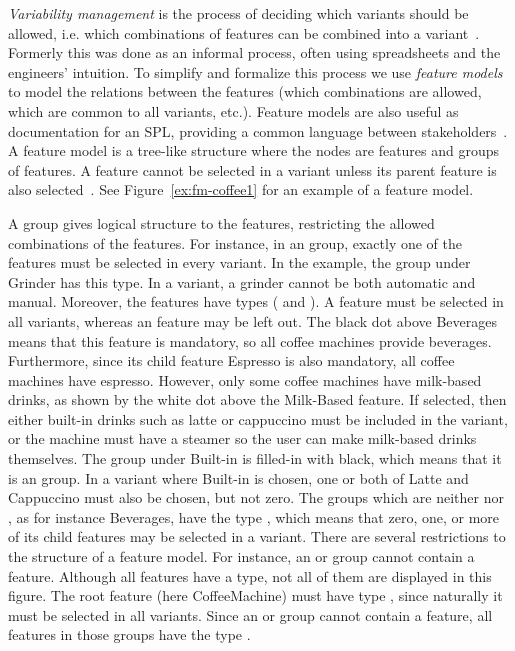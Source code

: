 \emph{Variability management} is the process of deciding which variants should be allowed, i.e. which combinations of features can be combined into a variant~\cite{art:variability-management-with-feature-models}. Formerly this was done as an informal process, often using spreadsheets and the engineers' intuition. To simplify and formalize this process we use \emph{feature models} to model the relations between the features (which combinations are allowed, which are common to all variants, etc.). Feature models are also useful as documentation for an SPL, providing a common language between stakeholders~\cite{book:introduction-to-spl}. A feature model is a tree-like structure where the nodes are features and groups of features. A feature cannot be selected in a variant unless its parent feature is also selected~\cite{art:feature-models-grammars-and-propositional-formulas}. See Figure~\vref{ex:fm-coffee1} for an example of a feature model. 

A group gives logical structure to the features, restricting the allowed combinations of the features. For instance, in an \xortype{} group, exactly one of the features must be selected in every variant. In the example, the group under Grinder has this type. In a variant, a grinder cannot be both automatic and manual. Moreover, the features have types (\optional{} and \mandatory{}). A \mandatory{} feature must be selected in all variants, whereas an \optional{} feature may be left out. The black dot above Beverages means that this feature is mandatory, so all coffee machines provide beverages. Furthermore, since its child feature Espresso is also mandatory, all coffee machines have espresso. However, only some coffee machines have milk-based drinks, as shown by the white dot above the Milk-Based feature. If selected, then either built-in drinks such as latte or cappuccino must be included in the variant, or the machine must have a steamer so the user can make milk-based drinks themselves. The group under Built-in is filled-in with black, which means that it is an \ortype{} group. In a variant where Built-in is chosen, one or both of Latte and Cappuccino must also be chosen, but not zero. The groups which are neither \xortype{} nor \ortype{}, as for instance Beverages, have the type \andtype{}, which means that zero, one, or more of its child features may be selected in a variant. There are several restrictions to the structure of a feature model. For instance, an \xortype{} or \ortype{} group cannot contain a \mandatory{} feature. Although all features have a type, not all of them are displayed in this figure. The root feature (here CoffeeMachine) must have type \mandatory{}, since naturally it must be selected in all variants. Since an \xortype{} or \ortype{} group cannot contain a \mandatory{} feature, all features in those groups have the type \optional{}.

